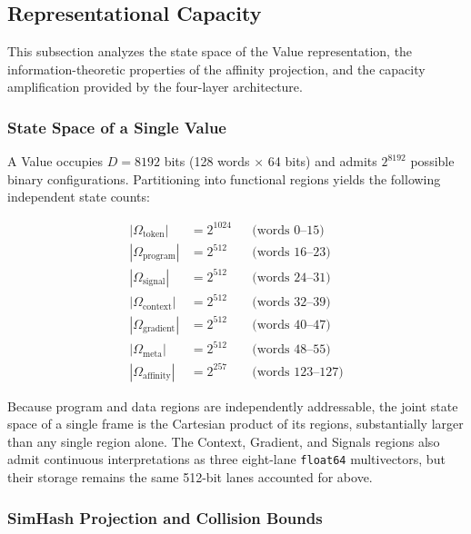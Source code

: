 \subsection{Representational Capacity}
\label{sec:capacity_analysis}

This subsection analyzes the state space of the Value representation,
the information-theoretic properties of the affinity projection, and
the capacity amplification provided by the four-layer architecture.

\subsubsection{State Space of a Single Value}

A Value occupies $D = 8192$ bits (128 words $\times$ 64 bits) and admits
$2^{8192}$ possible binary configurations.  Partitioning into functional
regions yields the following independent state counts:

\begin{align}
  |\Omega_{\text{token}}|   &= 2^{1024}  && \text{(words 0--15)} \\
  |\Omega_{\text{program}}|  &= 2^{512}  && \text{(words 16--23)} \\
  |\Omega_{\text{signal}}|   &= 2^{512}  && \text{(words 24--31)} \\
  |\Omega_{\text{context}}|  &= 2^{512}  && \text{(words 32--39)} \\
  |\Omega_{\text{gradient}}| &= 2^{512}  && \text{(words 40--47)} \\
  |\Omega_{\text{meta}}|     &= 2^{512}  && \text{(words 48--55)} \\
  |\Omega_{\text{affinity}}| &= 2^{257}  && \text{(words 123--127)}
\end{align}

Because program and data regions are independently addressable, the
joint state space of a single frame is the Cartesian product of its
regions, substantially larger than any single region alone.  The
Context, Gradient, and Signals regions also admit continuous
interpretations as three eight-lane \texttt{float64} multivectors, but
their storage remains the same 512-bit lanes accounted for above.

\subsubsection{SimHash Projection and Collision Bounds}


